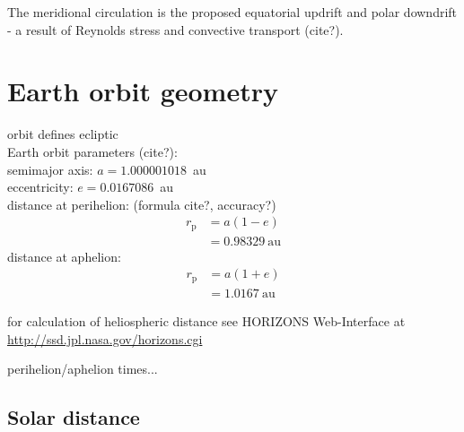 
The meridional circulation is the proposed equatorial updrift and polar downdrift - a result of Reynolds stress and convective transport (cite?).\\


\section{Earth orbit geometry}

orbit defines ecliptic\\

Earth orbit parameters (cite?):\\
semimajor axis: $a = 1.000001018$~au\\
eccentricity: $e = 0.0167086$~au\\
distance at perihelion: (formula cite?, accuracy?)\\
\begin{align}
	r_\text{p} &= a (1 - e)\\
		&= 0.98329~\text{au}	\nonumber
\end{align}
distance at aphelion:\\
\begin{align}
	r_\text{p} &= a (1 + e)\\
		&= 1.0167~\text{au}	\nonumber
\end{align}

for calculation of heliospheric distance see HORIZONS Web-Interface at \url{http://ssd.jpl.nasa.gov/horizons.cgi}

perihelion/aphelion times...

\subsection{Solar distance}

